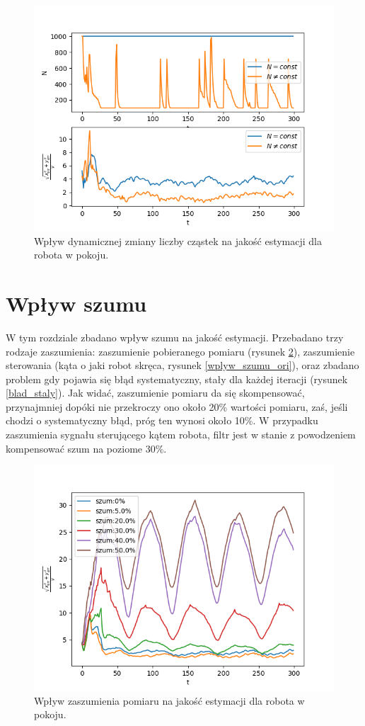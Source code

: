 \begin{figure}[H]
	\begin{center}
		\includegraphics[width=12cm]{./dynamic_N.png}
		\caption{Wpływ dynamicznej zmiany liczby cząstek na jakość estymacji dla robota w pokoju.}
		\label{dynamic_N}
	\end{center}
\end{figure}

\section{Wpływ szumu} \label{noise_chapter}
W tym rozdziale zbadano wpływ szumu na jakość estymacji. Przebadano trzy rodzaje zaszumienia: zaszumienie pobieranego pomiaru (rysunek \ref{wplyw_szumu}), zaszumienie sterowania (kąta o jaki robot skręca, rysunek \ref{wplyw_szumu_ori}), oraz zbadano problem gdy pojawia się błąd systematyczny, stały dla każdej iteracji (rysunek \ref{blad_staly}). Jak widać, zaszumienie pomiaru da się skompensować, przynajmniej dopóki nie przekroczy ono około 20\% wartości pomiaru, zaś, jeśli chodzi o systematyczny błąd, próg ten wynosi około 10\%. W przypadku zaszumienia sygnału sterującego kątem robota, filtr jest w stanie z powodzeniem kompensować szum na poziome 30\%.
\begin{figure}[H]
	\begin{center}
		\includegraphics[width=12cm]{./wplyw_szumu.png}
		\caption{Wpływ zaszumienia pomiaru na jakość estymacji dla robota w pokoju.}
		\label{wplyw_szumu}
	\end{center}
\end{figure}

